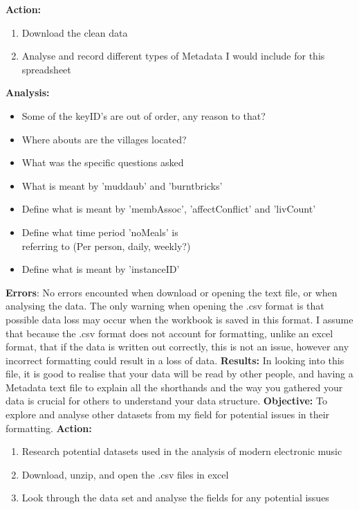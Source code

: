 \documentclass{article}
\begin{document}
\newline
\textbf{Action:}
\begin{enumerate}
    \item Download the clean data
    \item Analyse and record different types of Metadata I would include for this spreadsheet
\end{enumerate}
\textbf{Analysis:}
\begin{itemize}
    \item Some of the keyID's are out of order, any reason to that?
    \item Where abouts are the villages located?
    \item What was the specific questions asked
    \item What is meant by 'muddaub' and 'burntbricks'
    \item Define what is meant by 'membAssoc', 'affectConflict' and 'livCount'
    \item Define what time period 'noMeals' is \\ referring to (Per person, daily, weekly?)
    \item Define what is meant by 'instanceID'
\end{itemize}
\textbf{Errors}: No errors encounted when download or opening the text file, or when analysing the data. The only warning when opening the .csv format is that possible data loss may occur when the workbook is saved in this format. I assume that because the .csv format does not account for formatting, unlike an excel format, that if the data is written out correctly, this is not an issue, however any incorrect formatting could result in a loss of data.
\newline
\textbf{Results:} In looking into this file, it is good to realise that your data will be read by other people, and having a Metadata text file to explain all the shorthands and the way you gathered your data is crucial for others to understand your data structure. 
\vspace{5mm}
\newline
\textbf{Objective:} To explore and analyse other datasets from my field for potential issues in their formatting. 
\newline
\textbf{Action:}
\begin{enumerate}
    \item Research potential datasets used in the analysis of modern electronic music
    \item Download, unzip, and open the .csv files in excel
    \item Look through the data set and analyse the fields for any potential issues
\end{enumerate}
\end{document}
